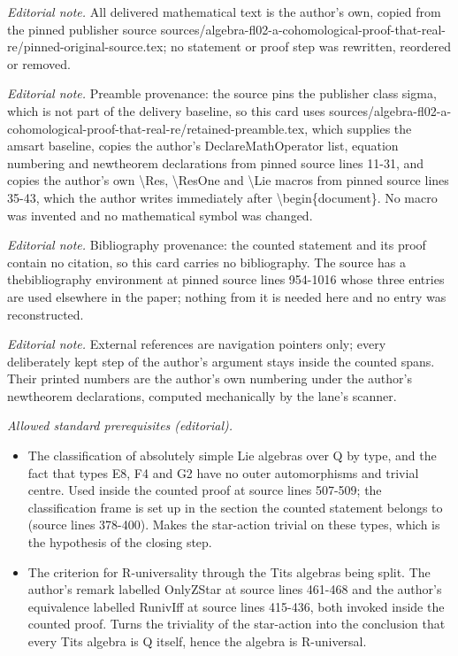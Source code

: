 \maketitle
\noindent\textit{Editorial note.} All delivered mathematical text is the author's own, copied from the pinned publisher source sources/algebra-fl02-a-cohomological-proof-that-real-re/pinned-original-source.tex; no statement or proof step was rewritten, reordered or removed.\par\medskip
\noindent\textit{Editorial note.} Preamble provenance: the source pins the publisher class sigma, which is not part of the delivery baseline, so this card uses sources/algebra-fl02-a-cohomological-proof-that-real-re/retained-preamble.tex, which supplies the amsart baseline, copies the author's DeclareMathOperator list, equation numbering and newtheorem declarations from pinned source lines 11-31, and copies the author's own \textbackslash{}Res, \textbackslash{}ResOne and \textbackslash{}Lie macros from pinned source lines 35-43, which the author writes immediately after \textbackslash{}begin\{document\}. No macro was invented and no mathematical symbol was changed.\par\medskip
\noindent\textit{Editorial note.} Bibliography provenance: the counted statement and its proof contain no citation, so this card carries no bibliography. The source has a thebibliography environment at pinned source lines 954-1016 whose three entries are used elsewhere in the paper; nothing from it is needed here and no entry was reconstructed.\par\medskip
\noindent\textit{Editorial note.} External references are navigation pointers only; every deliberately kept step of the author's argument stays inside the counted spans. Their printed numbers are the author's own numbering under the author's newtheorem declarations, computed mechanically by the lane's scanner.\par\medskip
\noindent\textit{Allowed standard prerequisites (editorial).}\begin{itemize}
\item The classification of absolutely simple Lie algebras over Q by type, and the fact that types E8, F4 and G2 have no outer automorphisms and trivial centre. Used inside the counted proof at source lines 507-509; the classification frame is set up in the section the counted statement belongs to (source lines 378-400). Makes the star-action trivial on these types, which is the hypothesis of the closing step.
\item The criterion for R-universality through the Tits algebras being split. The author's remark labelled OnlyZStar at source lines 461-468 and the author's equivalence labelled RunivIff at source lines 415-436, both invoked inside the counted proof. Turns the triviality of the star-action into the conclusion that every Tits algebra is Q itself, hence the algebra is R-universal.
\end{itemize}\medskip
